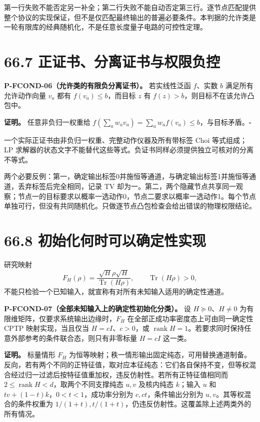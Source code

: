 \documentclass[
  11pt,
  oneside]{book}
\begin{document}
第一行失败不能否定另一补全；第二行失败不能自动否定第三行。逐节点匹配提供整个协议的实现保证，但不是仅匹配最终输出的普遍必要条件。本判据的允许类是一轮有限库的经典随机化，不是任意长度量子电路的可控性定理。

\section{66.7 正证书、分离证书与权限负控}

\protect\hypertarget{p-fcond-06}{}{}
\textbf{P-FCOND-06（允许类的有限负分离证书）。} 若实线性泛函 \(f\)、实数
\(b\) 满足所有允许动作向量 \(v_a\) 都有 \(f(v_a)\le b\)，而目标 \(z\) 有
\(f(z)>b\)，则目标不在该允许凸包中。

\textbf{证明。} 任意非负归一权重给
\(f(\sum_aw_av_a)=\sum_aw_af(v_a)\le b\)，与目标矛盾。\(\square\)

一个实际正证书由非负归一权重、完整动作仪器及所有带标签 Choi 等式组成；LP
求解器的状态文字不能替代这些等式。负证书同样必须提供独立可核对的分离不等式。

两个必要反例：第一，确定输出标签0并施恒等通道，与确定输出标签1并施恒等通道，丢弃标签后完全相同，记录
TV
却为一。第二，两个隐藏节点共享同一观察；节点一的目标要求以概率一选动作0，节点二要求以概率一选动作1。每个节点单独可行，但没有共同随机化。只做逐节点凸包检查会给出错误的物理权限结论。

\section{66.8 初始化何时可以确定性实现}

研究映射 \[
F_H(\rho)=\frac{\sqrt H\rho\sqrt H}{\operatorname{Tr}(H\rho)},\qquad
\operatorname{Tr}(H\rho)>0,
\] 不能只检验一个已知输入，就宣称有对所有未知输入适用的确定性通道。

\protect\hypertarget{p-fcond-07}{}{}
\textbf{P-FCOND-07（全部未知输入上的确定性初始化分类）。} 设
\(H\succeq0\)、\(H\ne0\) 为有限维矩阵，仅要求系统输出边缘时，\(F_H\)
在全部正成功率密度态上可由同一确定性 CPTP 映射实现，当且仅当
\(H=cI\)、\(c>0\)，或
\(\operatorname{rank}H=1\)。若要求同时保持任意外部参考的条件联合态，则只有非零标量
\(H=cI\) 这一类。

\textbf{证明。} 标量情形 \(F_H\)
为恒等映射；秩一情形输出固定纯态，可用替换通道制备。反向，若有两个不同的正特征值，取对应本征纯态：它们各自保持不变，但等权混合经过归一过滤后按特征值重加权，违反仿射性。若所有正特征值相同而
\(2\le\operatorname{rank}H<d\)，取两个不同支撑纯态 \(u,v\) 及核内纯态
\(k\)；输入 \(u\) 和 \(t v+(1-t)k\)，\(0<t<1\)，成功率分别为
\(c,ct\)，条件输出分别为 \(u,v\)。其等权混合的条件权重为
\(1/(1+t),t/(1+t)\)，仍违反仿射性。这覆盖除上述两类外的所有情况。
\end{document}

